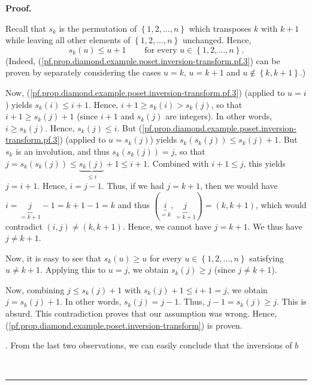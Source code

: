 \documentclass[numbers=enddot,12pt,final,onecolumn,notitlepage]{scrartcl}%
\theoremstyle{definition}
\newenvironment{proof}[1][Proof]{\noindent\textbf{#1.} }{\ \rule{0.5em}{0.5em}}
\newenvironment{verlong}{}{}
\begin{document}
\begin{proof}
\begin{verlong}
{\par
Recall that $s_{k}$ is the permutation of $\left\{  1,2,\ldots,n\right\}  $
which transposes $k$ with $k+1$ while leaving all other elements of $\left\{
1,2,\ldots,n\right\}  $ unchanged. Hence,%
\begin{equation}
s_{k}\left(  u\right)  \leq u+1\ \ \ \ \ \ \ \ \ \ \text{for every }%
u\in\left\{  1,2,\ldots,n\right\}  .
\label{pf.prop.diamond.example.poset.inversion-transform.pf.3}%
\end{equation}
(Indeed, (\ref{pf.prop.diamond.example.poset.inversion-transform.pf.3}) can be
proven by separately considering the cases $u=k$, $u=k+1$ and $u\notin\left\{
k,k+1\right\}  $.)
\par
Now, (\ref{pf.prop.diamond.example.poset.inversion-transform.pf.3}) (applied
to $u=i$) yields $s_{k}\left(  i\right)  \leq i+1$. Hence, $i+1\geq
s_{k}\left(  i\right)  >s_{k}\left(  j\right)  $, so that $i+1\geq
s_{k}\left(  j\right)  +1$ (since $i+1$ and $s_{k}\left(  j\right)  $ are
integers). In other words, $i\geq s_{k}\left(  j\right)  $. Hence,
$s_{k}\left(  j\right)  \leq i$. But
(\ref{pf.prop.diamond.example.poset.inversion-transform.pf.3}) (applied to
$u=s_{k}\left(  j\right)  $) yields $s_{k}\left(  s_{k}\left(  j\right)
\right)  \leq s_{k}\left(  j\right)  +1$. But $s_{k}$ is an involution, and
thus $s_{k}\left(  s_{k}\left(  j\right)  \right)  =j$, so that $j=s_{k}%
\left(  s_{k}\left(  j\right)  \right)  \leq\underbrace{s_{k}\left(  j\right)
}_{\leq i}+1\leq i+1$. Combined with $i+1\leq j$, this yields $j=i+1$. Hence,
$i=j-1$. Thus, if we had $j=k+1$, then we would have $i=\underbrace{j}%
_{=k+1}-1=k+1-1=k$ and thus $\left(  \underbrace{i}_{=k},\underbrace{j}%
_{=k+1}\right)  =\left(  k,k+1\right)  $, which would contradict $\left(
i,j\right)  \neq\left(  k,k+1\right)  $. Hence, we cannot have $j=k+1$. We
thus have $j\neq k+1$.
\par
Now, it is easy to see that $s_{k}\left(  u\right)  \geq u$ for every
$u\in\left\{  1,2,\ldots,n\right\}  $ satisfying $u\neq k+1$. Applying this to
$u=j$, we obtain $s_{k}\left(  j\right)  \geq j$ (since $j\neq k+1$).
\par
Now, combining $j\leq s_{k}\left(  j\right)  +1$ with $s_{k}\left(  j\right)
+1\leq i+1=j$, we obtain $j=s_{k}\left(  j\right)  +1$. In other words,
$s_{k}\left(  j\right)  =j-1$. Thus, $j-1=s_{k}\left(  j\right)  \geq j$. This
is absurd. This contradiction proves that our assumption was wrong. Hence,
(\ref{pf.prop.diamond.example.poset.inversion-transform}) is proven.}. From
the last two observations, we can easily conclude that the inversions of $b$

\end{verlong}
\end{proof}
\end{document}
